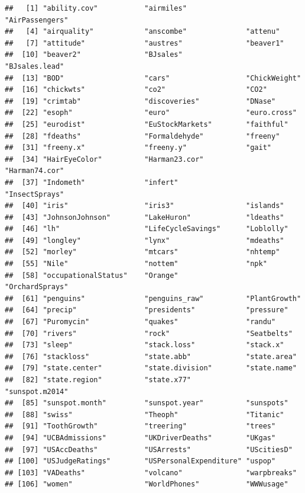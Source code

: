 \documentclass[
]{book}
\theoremstyle{definition}
\theoremstyle{definition}
\theoremstyle{definition}
\theoremstyle{definition}
\theoremstyle{remark}
\begin{document}
\begin{verbatim}
##   [1] "ability.cov"           "airmiles"              "AirPassengers"        
##   [4] "airquality"            "anscombe"              "attenu"               
##   [7] "attitude"              "austres"               "beaver1"              
##  [10] "beaver2"               "BJsales"               "BJsales.lead"         
##  [13] "BOD"                   "cars"                  "ChickWeight"          
##  [16] "chickwts"              "co2"                   "CO2"                  
##  [19] "crimtab"               "discoveries"           "DNase"                
##  [22] "esoph"                 "euro"                  "euro.cross"           
##  [25] "eurodist"              "EuStockMarkets"        "faithful"             
##  [28] "fdeaths"               "Formaldehyde"          "freeny"               
##  [31] "freeny.x"              "freeny.y"              "gait"                 
##  [34] "HairEyeColor"          "Harman23.cor"          "Harman74.cor"         
##  [37] "Indometh"              "infert"                "InsectSprays"         
##  [40] "iris"                  "iris3"                 "islands"              
##  [43] "JohnsonJohnson"        "LakeHuron"             "ldeaths"              
##  [46] "lh"                    "LifeCycleSavings"      "Loblolly"             
##  [49] "longley"               "lynx"                  "mdeaths"              
##  [52] "morley"                "mtcars"                "nhtemp"               
##  [55] "Nile"                  "nottem"                "npk"                  
##  [58] "occupationalStatus"    "Orange"                "OrchardSprays"        
##  [61] "penguins"              "penguins_raw"          "PlantGrowth"          
##  [64] "precip"                "presidents"            "pressure"             
##  [67] "Puromycin"             "quakes"                "randu"                
##  [70] "rivers"                "rock"                  "Seatbelts"            
##  [73] "sleep"                 "stack.loss"            "stack.x"              
##  [76] "stackloss"             "state.abb"             "state.area"           
##  [79] "state.center"          "state.division"        "state.name"           
##  [82] "state.region"          "state.x77"             "sunspot.m2014"        
##  [85] "sunspot.month"         "sunspot.year"          "sunspots"             
##  [88] "swiss"                 "Theoph"                "Titanic"              
##  [91] "ToothGrowth"           "treering"              "trees"                
##  [94] "UCBAdmissions"         "UKDriverDeaths"        "UKgas"                
##  [97] "USAccDeaths"           "USArrests"             "UScitiesD"            
## [100] "USJudgeRatings"        "USPersonalExpenditure" "uspop"                
## [103] "VADeaths"              "volcano"               "warpbreaks"           
## [106] "women"                 "WorldPhones"           "WWWusage"
\end{verbatim}
\end{document}
